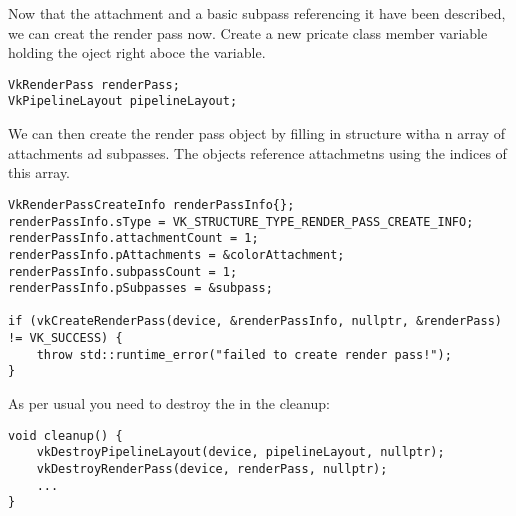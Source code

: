 \par Now that the attachment and a basic subpass referencing it have been described, we can creat the render pass now. Create a new pricate class member variable holding the  oject right aboce the  variable.

\begin{center}
\begin{minipage}{0.95\linewidth}
\begin{lstlisting}
VkRenderPass renderPass;
VkPipelineLayout pipelineLayout;
\end{lstlisting}
\end{minipage}
\end{center}

\par We can then create the render pass object by filling in  structure witha n array of attachments ad subpasses. The  objects reference attachmetns using the indices of this array.

\begin{center}
\begin{minipage}{0.95\linewidth}
\begin{lstlisting}
VkRenderPassCreateInfo renderPassInfo{};
renderPassInfo.sType = VK_STRUCTURE_TYPE_RENDER_PASS_CREATE_INFO;
renderPassInfo.attachmentCount = 1;
renderPassInfo.pAttachments = &colorAttachment;
renderPassInfo.subpassCount = 1;
renderPassInfo.pSubpasses = &subpass;

if (vkCreateRenderPass(device, &renderPassInfo, nullptr, &renderPass) != VK_SUCCESS) {
    throw std::runtime_error("failed to create render pass!");
}
\end{lstlisting}
\end{minipage}
\end{center}

\par As per usual you need to destroy the in the cleanup:

\begin{center}
\begin{minipage}{0.95\linewidth}
\begin{lstlisting}
void cleanup() {
    vkDestroyPipelineLayout(device, pipelineLayout, nullptr);
    vkDestroyRenderPass(device, renderPass, nullptr);
    ...
}
\end{lstlisting}
\end{minipage}
\end{center}

